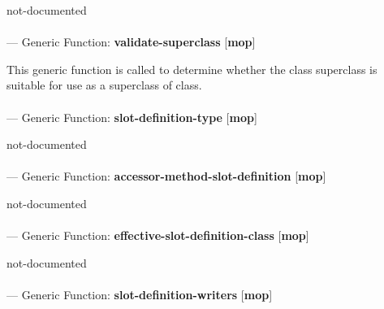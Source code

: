 \begin{adjustwidth}{5em}{5em}
not-documented
\end{adjustwidth}

\paragraph{}
\label{MOP:VALIDATE-SUPERCLASS}
--- Generic Function: \textbf{validate-superclass} [\textbf{mop}] \textit{}

\begin{adjustwidth}{5em}{5em}
This generic function is called to determine whether the class
  superclass is suitable for use as a superclass of class.
\end{adjustwidth}

\paragraph{}
\label{MOP:SLOT-DEFINITION-TYPE}
--- Generic Function: \textbf{slot-definition-type} [\textbf{mop}] \textit{}

\begin{adjustwidth}{5em}{5em}
not-documented
\end{adjustwidth}

\paragraph{}
\label{MOP:ACCESSOR-METHOD-SLOT-DEFINITION}
--- Generic Function: \textbf{accessor-method-slot-definition} [\textbf{mop}] \textit{}

\begin{adjustwidth}{5em}{5em}
not-documented
\end{adjustwidth}

\paragraph{}
\label{MOP:EFFECTIVE-SLOT-DEFINITION-CLASS}
--- Generic Function: \textbf{effective-slot-definition-class} [\textbf{mop}] \textit{}

\begin{adjustwidth}{5em}{5em}
not-documented
\end{adjustwidth}

\paragraph{}
\label{MOP:SLOT-DEFINITION-WRITERS}
--- Generic Function: \textbf{slot-definition-writers} [\textbf{mop}] \textit{}

